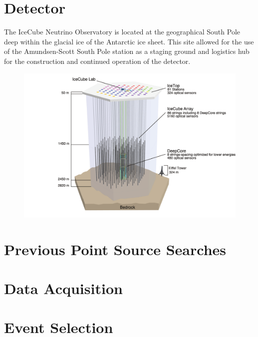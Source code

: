 \documentclass{gatech-thesis}
\begin{document}

\chapter{Detector}
The IceCube Neutrino Observatory is located at the geographical South Pole deep within the glacial ice of the Antarctic ice sheet. This site allowed for the use of the Amundsen-Scott South Pole station as a staging ground and logistics hub for the construction and continued operation of the detector. 


\begin{figure}
  \includegraphics[width=8.5in]{ArrayWSeasonsLabels.pdf} 
\end{figure}


\chapter{Previous Point Source Searches}

\chapter{Data Acquisition}

\chapter{Event Selection}
\end{document}
